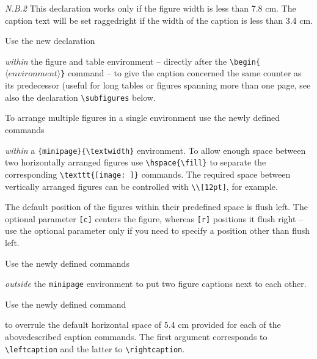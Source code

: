 \documentclass[graybox,square]{svmono}
\begin{document}
\begin{sloppy}
{\it N.B.2} This declaration works only if the figure width is less than 7.8 cm. The caption text will be set raggedright if the width of the caption is less than 3.4 cm.

Use the new declaration

\cprotect\boxtext{\verb|\samenumber|}

{\it within} the figure and table environment -- directly after the \verb|\begin{|$\langle environment\rangle$\verb|}| command -- to give the caption concerned the same counter as its predecessor (useful for long tables or figures spanning more than one page, see also the declaration \verb|\subfigures| below.

\pagebreak

To arrange multiple figures in a single environment use the newly defined commands

\cprotect{}

{\it within} a \verb|{minipage}{\textwidth}| environment. To allow enough space between two horizontally arranged figures use \verb|\hspace{\fill}| to separate the corresponding \verb|\texttt{[image: ]}| commands. The required space between vertically arranged figures can be controlled with \verb|\\[12pt]|, for example.

The default position of the figures within their predefined space is flush left. The optional parameter \verb|[c]| centers the figure, whereas \verb|[r]| positions it flush right -- use the optional parameter only if you need to specify a position other than flush left.

Use the newly defined commands

\cprotect{}

{\it outside} the \verb|minipage| environment to put two figure captions next to each other.

Use the newly defined command

\cprotect{}

to overrule the default horizontal space of 5.4 cm provided for each of the abovedescribed caption commands. The first argument corresponds to \verb|\leftcaption| and the latter to \verb|\rightcaption|.


\end{sloppy}
\end{document}
